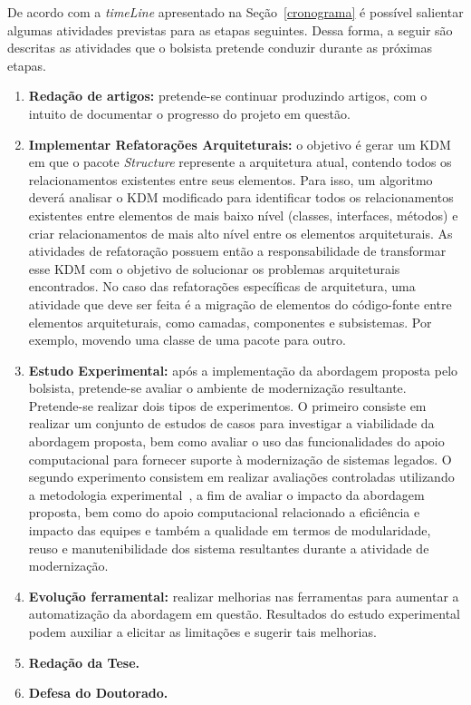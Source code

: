 
De acordo com a \textit{timeLine} apresentado na Seção~\ref{cronograma} é possível salientar algumas atividades previstas para as etapas seguintes. Dessa forma, a seguir são descritas as atividades que o bolsista pretende conduzir durante as próximas etapas.


\begin{enumerate}
	
	\item \textbf{Redação de artigos:} pretende-se continuar produzindo artigos, com o intuito de documentar o progresso do projeto em questão.

	\item \textbf{Implementar Refatorações Arquiteturais:} o objetivo é gerar um KDM em que o pacote \textit{Structure} represente a arquitetura atual, contendo todos os relacionamentos existentes entre seus elementos. Para isso, um algoritmo deverá analisar o KDM modificado para identificar todos os relacionamentos existentes entre elementos de mais baixo nível (classes, interfaces, métodos) e criar relacionamentos de mais alto nível entre os elementos arquiteturais. As atividades de refatoração possuem então a responsabilidade de transformar esse KDM com o objetivo de solucionar os problemas arquiteturais encontrados. No caso das refatorações específicas de arquitetura, uma atividade que deve ser feita é a migração de elementos do código-fonte entre elementos arquiteturais, como camadas, componentes e subsistemas. Por exemplo, movendo uma classe de uma pacote para outro.


	\item \textbf{Estudo Experimental:} após a implementação da abordagem proposta pelo bolsista, pretende-se avaliar o ambiente de modernização resultante. Pretende-se realizar dois tipos de experimentos. O primeiro consiste em realizar um conjunto de estudos de casos para investigar a viabilidade da abordagem proposta, bem como avaliar o uso das funcionalidades do apoio computacional para fornecer suporte à modernização de sistemas legados. O segundo experimento consistem em realizar avaliações controladas utilizando a metodologia experimental~\cite{Wohlin}, a fim de avaliar o impacto da abordagem proposta, bem como do apoio computacional relacionado a eficiência e impacto das equipes e também a qualidade em termos de modularidade, reuso e manutenibilidade dos sistema resultantes durante a atividade de modernização.

	\item \textbf{Evolução ferramental:} realizar melhorias nas ferramentas para aumentar a automatização da abordagem em questão. Resultados do estudo experimental podem auxiliar a elicitar as limitações e sugerir tais melhorias.

	\item \textbf{Redação da Tese.}

	\item \textbf{Defesa do Doutorado.}  

	 
\end{enumerate}